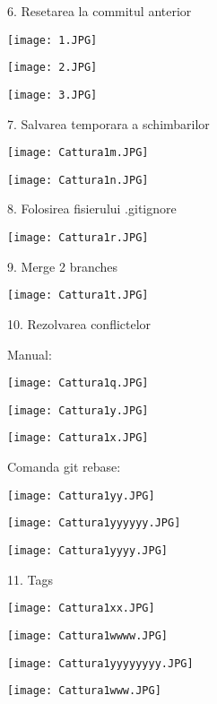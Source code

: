 6. Resetarea la commitul anterior

\texttt{[image: 1.JPG]}

\texttt{[image: 2.JPG]}

\texttt{[image: 3.JPG]}

7. Salvarea temporara a schimbarilor

\texttt{[image: Cattura1m.JPG]}

\texttt{[image: Cattura1n.JPG]}

8. Folosirea fisierului .gitignore

\texttt{[image: Cattura1r.JPG]}

9. Merge 2 branches

\texttt{[image: Cattura1t.JPG]}

\clearpage

10. Rezolvarea conflictelor 

Manual:

\texttt{[image: Cattura1q.JPG]}

\texttt{[image: Cattura1y.JPG]}

\texttt{[image: Cattura1x.JPG]}

Comanda git rebase:

\texttt{[image: Cattura1yy.JPG]}

\texttt{[image: Cattura1yyyyyy.JPG]}

\texttt{[image: Cattura1yyyy.JPG]}

11. Tags

\texttt{[image: Cattura1xx.JPG]}

\texttt{[image: Cattura1wwww.JPG]}

\texttt{[image: Cattura1yyyyyyyy.JPG]}

\texttt{[image: Cattura1www.JPG]}



\clearpage
        
